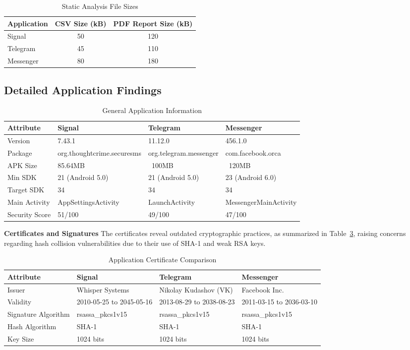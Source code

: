 \documentclass[a4paper,12pt]{report}
\begin{document}
\begin{table}[H]
\centering
\begin{tabular}{|l|c|c|}
\hline
\textbf{Application} & \textbf{CSV Size (kB)} & \textbf{PDF Report Size (kB)} \\
\hline
Signal & 50 & 120 \\
Telegram & 45 & 110 \\
Messenger & 80 & 180 \\
\hline
\end{tabular}
\caption{Static Analysis File Sizes}
\label{tab:static-files}
\end{table}

\subsection{Detailed Application Findings}

\begin{table}[H]
\centering
\begin{tabular}{|l|l|l|l|}
\hline
\textbf{Attribute} & \textbf{Signal} & \textbf{Telegram} & \textbf{Messenger} \\
\hline
Version & 7.43.1 & 11.12.0 & 456.1.0 \\
Package & org.thoughtcrime.securesms & org.telegram.messenger & com.facebook.orca \\
APK Size & 85.64MB & ~100MB & ~120MB \\
Min SDK & 21 (Android 5.0) & 21 (Android 5.0) & 23 (Android 6.0) \\
Target SDK & 34 & 34 & 34 \\
Main Activity & AppSettingsActivity & LaunchActivity & MessengerMainActivity \\
Security Score & 51/100 & 49/100 & 47/100 \\
\hline
\end{tabular}
\caption{General Application Information}
\label{tab:app-info}
\end{table}

\textbf{Certificates and Signatures}
The certificates reveal outdated cryptographic practices, as summarized in Table~\ref{tab:certificates}, raising concerns regarding hash collision vulnerabilities due to their use of SHA-1 and weak RSA keys.

\begin{table}[H]
\centering
\begin{tabular}{|l|p{4cm}|p{4cm}|p{4cm}|}
\hline
\textbf{Attribute} & \textbf{Signal} & \textbf{Telegram} & \textbf{Messenger} \\
\hline
Issuer & Whisper Systems & Nikolay Kudashov (VK) & Facebook Inc. \\
Validity & 2010-05-25 to 2045-05-16 & 2013-08-29 to 2038-08-23 & 2011-03-15 to 2036-03-10 \\
Signature Algorithm & rsassa\_pkcs1v15 & rsassa\_pkcs1v15 & rsassa\_pkcs1v15 \\
Hash Algorithm & SHA-1 & SHA-1 & SHA-1 \\
Key Size & 1024 bits & 1024 bits & 1024 bits \\
\hline
\end{tabular}
\caption{Application Certificate Comparison}
\label{tab:certificates}
\end{table}
\end{document}
